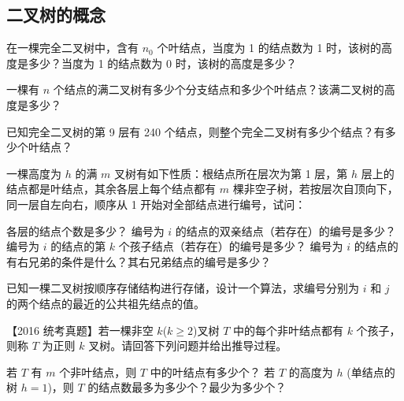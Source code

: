 \subsection{二叉树的概念}

\begin{qitems}

    \begin{bbox}
        \qitem 在一棵完全二叉树中，含有 $n_0$ 个叶结点，当度为 1 的结点数为 1 时，该树的高度是多少？当度为 1 的结点数为 0 时，该树的高度是多少？
    \end{bbox}

    \begin{bbox}
        \qitem 一棵有 $n$ 个结点的满二叉树有多少个分支结点和多少个叶结点？该满二叉树的高度是多少？
    \end{bbox}

    \begin{bbox}
        \qitem 已知完全二叉树的第 9 层有 240 个结点，则整个完全二叉树有多少个结点？有多少个叶结点？
    \end{bbox}

    \begin{bbox}
        \qitem 一棵高度为 $h$ 的满 $m$ 叉树有如下性质：根结点所在层次为第 1 层，第 $h$ 层上的结点都是叶结点，其余各层上每个结点都有 $m$ 棵非空子树，若按层次自顶向下，同一层自左向右，顺序从 1 开始对全部结点进行编号，试问：
        \begin{subqitems}
            \subqitem 各层的结点个数是多少？
            \subqitem 编号为 $i$ 的结点的双亲结点（若存在）的编号是多少？
            \subqitem 编号为 $i$ 的结点的第 $k$ 个孩子结点（若存在）的编号是多少？
            \subqitem 编号为 $i$ 的结点的有右兄弟的条件是什么？其右兄弟结点的编号是多少？
        \end{subqitems}
    \end{bbox}

    \begin{bbox}
        \qitem 已知一棵二叉树按顺序存储结构进行存储，设计一个算法，求编号分别为 $i$ 和 $j$ 的两个结点的最近的公共祖先结点的值。
    \end{bbox}
    
    \begin{bbox}
        \qitem 【2016 统考真题】若一棵非空 $k$($k \ge 2$)叉树 $T$ 中的每个非叶结点都有 $k$ 个孩子，则称 $T$ 为正则 $k$ 叉树。请回答下列问题并给出推导过程。
        \begin{subqitems}
            \subqitem 若 $T$ 有 $m$ 个非叶结点，则 $T$ 中的叶结点有多少个？
            \subqitem 若 $T$ 的高度为 $h$ (单结点的树 $h=1$)，则 $T$ 的结点数最多为多少个？最少为多少个？
        \end{subqitems}
    \end{bbox}

\end{qitems} 